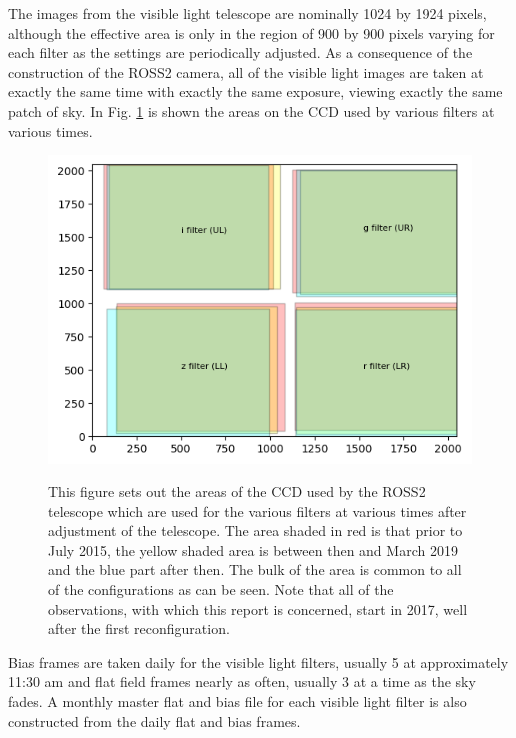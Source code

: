 The images from the visible light telescope are nominally 1024 by 1924 pixels,
although the effective area is only in the region of 900 by 900
pixels varying for each filter as the settings are periodically adjusted.
As a consequence of the construction of the ROSS2 camera, all of the visible
light images are taken at exactly the same time with exactly the same
exposure, viewing exactly the same patch of sky. In Fig. \ref{fig:showusedccd}
is shown the areas on the CCD used by various filters at various times.

\begin{figure}[!htbp]
\begin{center}
\includegraphics[scale=1]{images/showusedccd.png} \\
\end{center}   
\caption{This figure sets out the areas of the CCD used by the ROSS2
telescope which are used for the various filters at various times after
adjustment of the telescope. The area shaded in red is that prior to July 2015, the yellow shaded area is between
then and March 2019 and the blue part after then. The bulk of the area is
common to all of the configurations as can be seen. Note that all of the
{\rdwarf} observations, with which this report is concerned, start in 2017, well
after the first reconfiguration.} \protect\label{fig:showusedccd}
\end{figure}

Bias frames are taken daily for the visible light filters, usually 5 at
approximately 11:30 am and flat field frames nearly as often, usually 3 at a
time as the sky fades. A monthly master flat and bias file for each visible
light filter is also constructed from the daily flat and bias frames.

